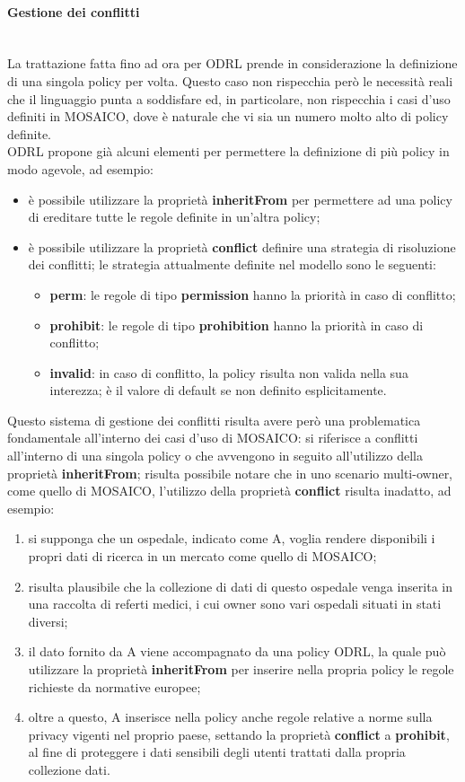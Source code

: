 \documentclass[12pt,a4paper,twoside]{book}
\begin{document}
\paragraph{Gestione dei conflitti}\mbox{}\\
La trattazione fatta fino ad ora per ODRL prende in considerazione la definizione di una singola policy per volta. Questo caso non rispecchia però le necessità reali che il linguaggio punta a soddisfare ed, in particolare, non rispecchia i casi d'uso definiti in MOSAICO, dove è naturale che vi sia un numero molto alto di policy definite.\\
ODRL propone già alcuni elementi per permettere la definizione di più policy in modo agevole, ad esempio: 
\begin{itemize}
	\item è possibile utilizzare la proprietà \textbf{inheritFrom} per permettere ad una policy di ereditare tutte le regole definite in un'altra policy;
	\item è possibile utilizzare la proprietà \textbf{conflict} definire una strategia di risoluzione dei conflitti; le strategia attualmente definite nel modello sono le seguenti:
	\begin{itemize}
		\item \textbf{perm}: le regole di tipo \textbf{permission} hanno la priorità in caso di conflitto;
		\item \textbf{prohibit}: le regole di tipo \textbf{prohibition} hanno la priorità in caso di conflitto;
		\item \textbf{invalid}: in caso di conflitto, la policy risulta non valida nella sua interezza; è il valore di default se non definito esplicitamente.
	\end{itemize}
\end{itemize}
Questo sistema di gestione dei conflitti risulta avere però una problematica fondamentale all'interno dei casi d'uso di MOSAICO: si riferisce a conflitti all'interno di una singola policy o che avvengono in seguito all'utilizzo della proprietà \textbf{inheritFrom}; risulta possibile notare che in uno scenario multi-owner, come quello di MOSAICO, l'utilizzo della proprietà \textbf{conflict} risulta inadatto, ad esempio:
\begin{enumerate}
	\item si supponga che un ospedale, indicato come A, voglia rendere disponibili i propri dati di ricerca in un mercato come quello di MOSAICO;
	\item risulta plausibile che la collezione di dati di questo ospedale venga inserita in una raccolta di referti medici, i cui owner sono vari ospedali situati in stati diversi;
	\item il dato fornito da A viene accompagnato da una policy ODRL, la quale può utilizzare la proprietà \textbf{inheritFrom} per inserire nella propria policy le regole richieste da normative europee;
	\item oltre a questo, A inserisce nella policy anche regole relative a norme sulla privacy vigenti nel proprio paese, settando la proprietà \textbf{conflict} a \textbf{prohibit}, al fine di proteggere i dati sensibili degli utenti trattati dalla propria collezione dati.
\end{enumerate}
\end{document}
